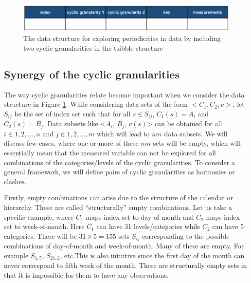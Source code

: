 \documentclass[12pt]{article}
\begin{document}
\begin{figure}[htb]

{\centering \includegraphics[width=\textwidth]{Figs/data-structure-v1} 

}

\caption{The data structure for exploring periodicities in data by including two cyclic granularities in the tsibble structure}\label{fig:data-structure}
\end{figure}

\hypertarget{sec:synergy}{%
\subsection{Synergy of the cyclic granularities}\label{sec:synergy}}

The way cyclic granularities relate become important when we consider the data structure in Figure \ref{fig:data-structure}. While considering data sets of the form \(<C_1, C_2, v>\), let \(S_{ij}\) be the set of index set such that for all \(s \in S_{ij}\), \(C_1(s) = A_i\) and \(C_2(s) = B_j\). Data subsets like \textless{}\(A_i\), \(B_j\), \(v(s)\)\textgreater{} can be obtained for all \(i \in {1, 2, \dots, n}\) and \(j \in {1, 2, \dots, m}\) which will lead to \(nm\) data subsets. We will discuss few cases, where one or more of these \(nm\) sets will be empty, which will essentially mean that the measured variable can not be explored for all combinations of the categories/levels of the cyclic granularities. To consider a general framework, we will define pairs of cyclic granularities as harmonies or clashes.

Firstly, empty combinations can arise due to the structure of the calendar or hierarchy.
These are called ``structurally'' empty combinations. Let us take a specific example, where \(C_1\) maps index set to day-of-month and \(C_2\) maps index set to week-of-month. Here \(C_1\) can have 31 levels/categories while \(C_2\) can have 5 categories. There will be \(31\times 5=155\) sets \(S_{ij}\) corresponding to the possible combinations of day-of-month and week-of-month. Many of these are empty. For example \(S_{1,5}\), \(S_{21,2}\), etc.This is also intuitive since the first day of the month can never correspond to fifth week of the month. These are structurally empty sets in that it is impossible for them to have any observations.
\end{document}
